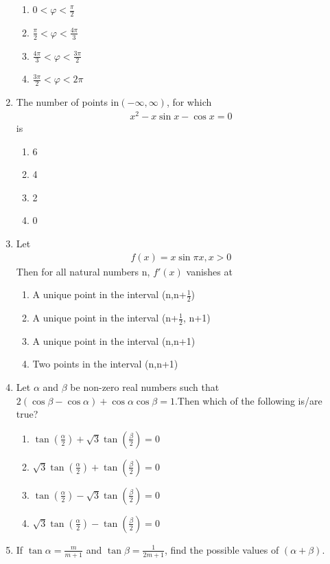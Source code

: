 \begin{enumerate}[label=\arabic*.,ref=\thesubsection.\theenumi]
\begin{enumerate}
        \item $0< \varphi < \frac{\pi}{2}$
        \item $\frac{\pi}{2}< \varphi < \frac{4\pi}{3}$
        \item $\frac{4\pi}{3}< \varphi < \frac{3\pi}{2}$
        \item $\frac{3\pi}{2}< \varphi < 2\pi$
    \end{enumerate}
    \item The number of points in$(-\infty,\infty)$, for which \begin{align}
        x^2-x\sin{x} -\cos{x} =0
    \end{align}
    is
    \begin{enumerate}
        \item 6
        \item 4
        \item 2
        \item 0
    \end{enumerate}
    \item Let 
    \begin{align}
    f(x) = x \sin{\pi x}, x> 0
    \end{align}Then for all natural numbers n, $f'(x)$ vanishes at
    \begin{enumerate}
        \item A unique point in the interval (n,n+$\frac{1}{2}$)
        \item A unique point in the interval (n+$\frac{1}{2}$, n+1)
        \item A unique point in the interval (n,n+1)
        \item Two points in the interval (n,n+1)
    \end{enumerate}
    \item Let $\alpha$ and $\beta$ be non-zero real numbers such that $2(\cos{\beta}-\cos{\alpha}) + \cos{\alpha}\cos{\beta}= 1$.Then which of the following is/are true?
    \begin{enumerate}
        \item $\tan{(\frac{\alpha}{2})}+\sqrt3\tan{(\frac{\beta}{2})} = 0$
        \item $\sqrt3\tan{(\frac{\alpha}{2})}+\tan{(\frac{\beta}{2})} = 0$
        \item $\tan{(\frac{\alpha}{2})}-\sqrt3\tan{(\frac{\beta}{2})} = 0$
        \item $\sqrt3\tan{(\frac{\alpha}{2})}-\tan{(\frac{\beta}{2})} = 0$
    \end{enumerate}
    \item If $\tan{\alpha} = \frac{m}{m+1}$ and $\tan{\beta} =\frac{1}{2m+1}$, find the possible values of $(\alpha+\beta).$

\end{enumerate}
